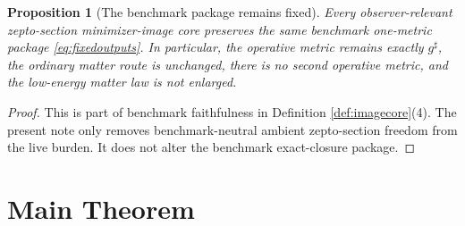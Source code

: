 \documentclass[11pt]{article}
\newcommand{\CompletedMetric}{g^{\sharp}}
\newtheorem{proposition}{Proposition}
\begin{document}
\begin{proposition}[The benchmark package remains fixed]
\label{prop:benchmark}
Every observer-relevant zepto-section minimizer-image core preserves the same benchmark one-metric package \eqref{eq:fixedoutputs}. In particular, the operative metric remains exactly \(\CompletedMetric\), the ordinary matter route is unchanged, there is no second operative metric, and the low-energy matter law is not enlarged.
\end{proposition}

\begin{proof}
This is part of benchmark faithfulness in Definition \ref{def:imagecore}(4). The present note only removes benchmark-neutral ambient zepto-section freedom from the live burden. It does not alter the benchmark exact-closure package.
\end{proof}

\section{Main Theorem}
\end{document}
